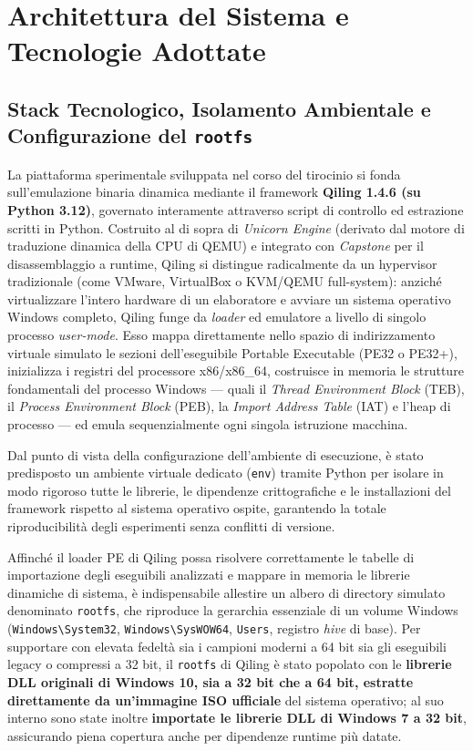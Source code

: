 \documentclass[11pt, a4paper]{article}
\begin{document}
\section{Architettura del Sistema e Tecnologie Adottate}

\subsection{Stack Tecnologico, Isolamento Ambientale e Configurazione del \texttt{rootfs}}

La piattaforma sperimentale sviluppata nel corso del tirocinio si fonda sull'emulazione binaria dinamica mediante il framework \textbf{Qiling 1.4.6 (su Python 3.12)}, governato interamente attraverso script di controllo ed estrazione scritti in Python. Costruito al di sopra di \textit{Unicorn Engine} (derivato dal motore di traduzione dinamica della CPU di QEMU) e integrato con \textit{Capstone} per il disassemblaggio a runtime, Qiling si distingue radicalmente da un hypervisor tradizionale (come VMware, VirtualBox o KVM/QEMU full-system): anzich\'e virtualizzare l'intero hardware di un elaboratore e avviare un sistema operativo Windows completo, Qiling funge da \textit{loader} ed emulatore a livello di singolo processo \textit{user-mode}. Esso mappa direttamente nello spazio di indirizzamento virtuale simulato le sezioni dell'eseguibile Portable Executable (PE32 o PE32+), inizializza i registri del processore x86/x86\_64, costruisce in memoria le strutture fondamentali del processo Windows --- quali il \textit{Thread Environment Block} (TEB), il \textit{Process Environment Block} (PEB), la \textit{Import Address Table} (IAT) e l'heap di processo --- ed emula sequenzialmente ogni singola istruzione macchina.

Dal punto di vista della configurazione dell'ambiente di esecuzione, \`e stato predisposto un ambiente virtuale dedicato (\texttt{env}) tramite Python per isolare in modo rigoroso tutte le librerie, le dipendenze crittografiche e le installazioni del framework rispetto al sistema operativo ospite, garantendo la totale riproducibilit\`a degli esperimenti senza conflitti di versione.

Affinch\'e il loader PE di Qiling possa risolvere correttamente le tabelle di importazione degli eseguibili analizzati e mappare in memoria le librerie dinamiche di sistema, \`e indispensabile allestire un albero di directory simulato denominato \texttt{rootfs}, che riproduce la gerarchia essenziale di un volume Windows (\texttt{Windows\textbackslash\allowbreak{}System32}, \texttt{Windows\textbackslash\allowbreak{}SysWOW64}, \texttt{Users}, registro \textit{hive} di base). Per supportare con elevata fedelt\`a sia i campioni moderni a 64 bit sia gli eseguibili legacy o compressi a 32 bit, il \texttt{rootfs} di Qiling \`e stato popolato con le \textbf{librerie DLL originali di Windows 10, sia a 32 bit che a 64 bit, estratte direttamente da un'immagine ISO ufficiale} del sistema operativo; al suo interno sono state inoltre \textbf{importate le librerie DLL di Windows 7 a 32 bit}, assicurando piena copertura anche per dipendenze runtime pi\`u datate.
\end{document}
